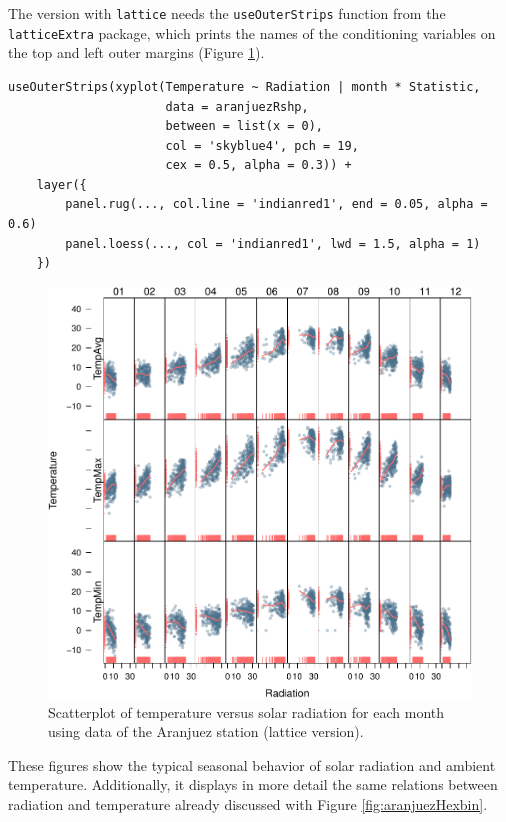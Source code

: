 The version with \texttt{lattice} needs the \texttt{useOuterStrips} function from
the \texttt{latticeExtra} package, which prints the names of the conditioning
variables on the top and left outer margins (Figure
 \ref{fig:aranjuezOuterStrips}).


\lstset{language=r,label= ,caption= ,captionpos=b,numbers=none}
\begin{lstlisting}
useOuterStrips(xyplot(Temperature ~ Radiation | month * Statistic,
                      data = aranjuezRshp,
                      between = list(x = 0),
                      col = 'skyblue4', pch = 19,
                      cex = 0.5, alpha = 0.3)) +
    layer({
        panel.rug(..., col.line = 'indianred1', end = 0.05, alpha = 0.6)
        panel.loess(..., col = 'indianred1', lwd = 1.5, alpha = 1)
    })
\end{lstlisting}

\begin{figure}[htbp]
\centering
\includegraphics[width=.9\linewidth]{figs/aranjuezOuterStrips.pdf}
\caption{Scatterplot of temperature versus solar radiation for each month using data of the Aranjuez station (lattice version). \label{fig:aranjuezOuterStrips}}
\end{figure}

These figures show the typical seasonal behavior of solar radiation
and ambient temperature. Additionally, it displays in more detail the
same relations between radiation and temperature already discussed
with Figure \ref{fig:aranjuezHexbin}.
